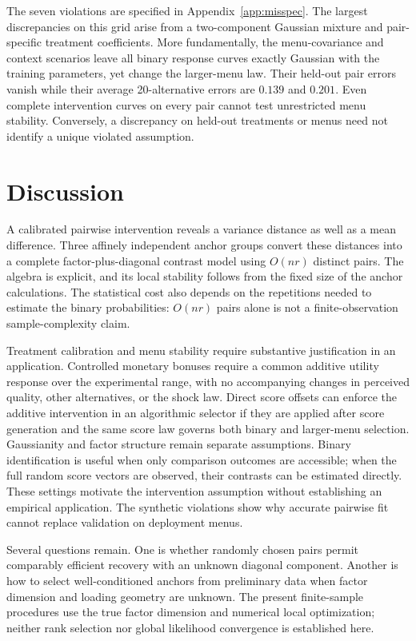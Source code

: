 \documentclass[11pt]{amsart}
\theoremstyle{definition}\newtheorem{example}[theorem]{Example}
\theoremstyle{remark}\newtheorem{remark}[theorem]{Remark}
\begin{document}
The seven violations are specified in Appendix~\ref{app:misspec}. The largest discrepancies on this grid arise from a two-component Gaussian mixture and pair-specific treatment coefficients. More fundamentally, the menu-covariance and context scenarios leave all binary response curves exactly Gaussian with the training parameters, yet change the larger-menu law. Their held-out pair errors vanish while their average 20-alternative errors are $0.139$ and $0.201$. Even complete intervention curves on every pair cannot test unrestricted menu stability. Conversely, a discrepancy on held-out treatments or menus need not identify a unique violated assumption.

\section{Discussion}
A calibrated pairwise intervention reveals a variance distance as well as a mean difference. Three affinely independent anchor groups convert these distances into a complete factor-plus-diagonal contrast model using $O(nr)$ distinct pairs. The algebra is explicit, and its local stability follows from the fixed size of the anchor calculations. The statistical cost also depends on the repetitions needed to estimate the binary probabilities: $O(nr)$ pairs alone is not a finite-observation sample-complexity claim.

Treatment calibration and menu stability require substantive justification in an application. Controlled monetary bonuses require a common additive utility response over the experimental range, with no accompanying changes in perceived quality, other alternatives, or the shock law. Direct score offsets can enforce the additive intervention in an algorithmic selector if they are applied after score generation and the same score law governs both binary and larger-menu selection. Gaussianity and factor structure remain separate assumptions. Binary identification is useful when only comparison outcomes are accessible; when the full random score vectors are observed, their contrasts can be estimated directly. These settings motivate the intervention assumption without establishing an empirical application. The synthetic violations show why accurate pairwise fit cannot replace validation on deployment menus.

Several questions remain. One is whether randomly chosen pairs permit comparably efficient recovery with an unknown diagonal component. Another is how to select well-conditioned anchors from preliminary data when factor dimension and loading geometry are unknown. The present finite-sample procedures use the true factor dimension and numerical local optimization; neither rank selection nor global likelihood convergence is established here.
\end{document}
